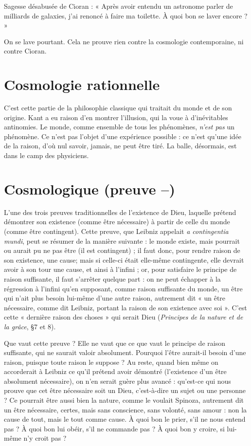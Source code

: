 Sagesse désabusée de Cioran : « Après avoir entendu un astronome parler
de milliards de galaxies, j’ai renoncé à faire ma toilette. À quoi bon se laver
encore ? »

On se lave pourtant. Cela ne prouve rien contre la cosmologie contemporaine, ni
contre Cioran.

\section{Cosmologie rationnelle}
C’est cette partie de la philosophie classique
qui traitait du monde et de son
origine. Kant a eu raison d’en montrer l'illusion, qui la voue à d’inévitables
antinomies. Le monde, comme ensemble de tous les phénomènes, {\it n'est pas} un
phénomène. Ce n’est pas l’objet d’une expérience possible : ce n’est qu’une idée
de la raison, d’où nul savoir, jamais, ne peut être tiré. La balle, désormais, est
dans le camp des physiciens.

\section{Cosmologique (preuve {\bf --})}
L'une des trois preuves traditionnelles de
l'existence de Dieu, laquelle prétend
démontrer son existence (comme être nécessaire) à partir de celle du monde
(comme être contingent). Cette preuve, que Leibniz appelait {\it a contingentia
mundi}, peut se résumer de la manière suivante : le monde existe, mais pourrait
ou aurait pu ne pas être (il est contingent) ; il faut donc, pour rendre raison de
son existence, une cause; mais si celle-ci était elle-même contingente, elle
devrait avoir à son tour une cause, et ainsi à l'infini ; or, pour satisfaire le principe
de raison suffisante, il faut s’arrêter quelque part : on ne peut échapper à
la régression à l'infini qu’en supposant, comme raison suffisante du monde, un
être qui n’ait plus besoin lui-même d’une autre raison, autrement dit « un être
nécessaire, comme dit Leibniz, portant la raison de son existence avec soi ».
C’est cette « dernière raison des choses » qui serait Dieu ({\it Principes de la nature
et de la grâce}, \S 7 et 8).

Que vaut cette preuve ? Elle ne vaut que ce que vaut le principe de raison
suffisante, qui ne saurait valoir absolument. Pourquoi l’être aurait-il besoin
d’une raison, puisque toute raison le suppose ? Au reste, quand bien même on
accorderait à Leibniz ce qu’il prétend avoir démontré (l’existence d’un être
absolument nécessaire), on n’en serait guère plus avancé : qu’est-ce qui nous
prouve que cet être nécessaire soit un Dieu, c’est-à-dire un sujet ou une
personne ? Ce pourrait être aussi bien la nature, comme le voulait Spinoza,
autrement dit un être nécessaire, certes, mais sans conscience, sans volonté, sans
amour : non la cause de tout, mais le tout comme cause. À quoi bon le prier,
s’il ne nous entend pas ? À quoi bon lui obéir, s’il ne commande pas ? À quoi
bon y croire, si lui-même n’y croit pas ?

